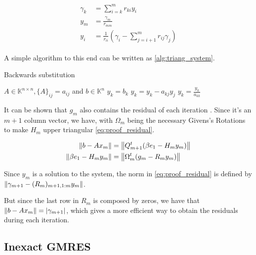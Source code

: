 \begin{align}\label{eq:triangular_system}
    \begin{split}
        \gamma_{k} &= \sum_{i=k}^{m} r_{ki} y_{i}\\
        y_{m} &= \frac{\gamma_{m}}{r_{mm}} \\
        y_{i} &= \frac{1}{r_{ii}} \left( \gamma_{i} - \sum_{j=i+1}^{m} r_{ij} \gamma_{j}  \right)
    \end{split}
\end{align}

A simple algorithm to this end can be written as \ref{alg:triang_system}.

\begin{algorithm}
    \caption{Backwards substitution}\label{alg:triang_system}
    \begin{algorithmic}[1]
        \State $A \in \mathbb{K}^{n \times n}, \{ A \}_{ij} = a_{ij}$ and $b\in \mathbb{K}^{n}$
        \State $y_{k} = b_{k}$
        \State $y_{k} = y_{k} - a_{kj}y_{j}$
        \EndFor
        \State $y_{k} = \frac{y_{k}}{a_{kk}}$
        \EndFor
    \end{algorithmic}
\end{algorithm}



It can be shown that $g_{m}$ also contains the residual of each iteration \cite{saad2003iterative}. Since it's an $m+1$ column vector, we have, with $\Omega_{m}$ being the necessary Givens's Rotations to make $H_{m}$ upper triangular \ref{eq:proof_residual}.

\begin{align}\label{eq:proof_residual}
    \begin{split}
        \left\lVert b - Ax_{m}\right\rVert & = \left\lVert Q_{m+1}^{t}(\beta e_{1} - H_{m}y_{m})\right\rVert\\
        \left\lVert\beta e_{1} - H_{m}y_{m}\right\rVert &= \left\lVert\Omega_{m}^{t} (g_{m} - R_{m}y_{m})\right\rVert
    \end{split}
\end{align}

Since $y_{m}$ is a solution to the system, the norm in \ref{eq:proof_residual} is defined by $\left\lVert\gamma_{m+1} - (R_{m})_{m+1,1:m} y_{m}\right\rVert$.

But since the last row in $R_{m}$ is composed by zeros, we have that $\left\lVert b - Ax_{m}\right\rVert = |\gamma_{m+1}|$, which gives a more efficient way to obtain the residuals during each iteration.


\subsection{Inexact GMRES}

